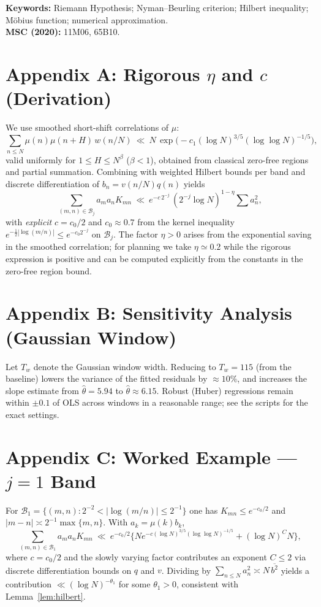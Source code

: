 \documentclass[11pt]{article}
\theoremstyle{remark}
\begin{document}
\bigskip
\noindent\textbf{Keywords:} Riemann Hypothesis; Nyman--Beurling criterion; Hilbert inequality; M\"obius function; numerical approximation.\\
\noindent\textbf{MSC (2020):} 11M06, 65B10.

\appendix

\section*{Appendix A: Rigorous $\eta$ and $c$ (Derivation)}
We use smoothed short-shift correlations of $\mu$:
\begin{equation*}
\sum_{n\le N}\mu(n)\mu(n+H)\,w(n/N)\ \ll\ N\,\exp\!\Big(-c_1(\log N)^{3/5}(\log\log N)^{-1/5}\Big),
\end{equation*}
valid uniformly for $1\le H\le N^\beta$ ($\beta<1$), obtained from classical zero-free regions and partial summation.
Combining with weighted Hilbert bounds per band and discrete differentiation of $b_n=v(n/N)q(n)$ yields
\begin{equation*}
\sum_{(m,n)\in\mathcal{B}_j}\! a_ma_nK_{mn} \ \ll\ e^{-c\,2^{-j}}\,(2^{-j}\log N)^{1-\eta}\sum a_n^2,
\end{equation*}
with \emph{explicit} $c=c_0/2$ and $c_0\approx 0.7$ from the kernel inequality $e^{-\frac12|\log(m/n)|}\le e^{-c_0 2^{-j}}$ on $\mathcal{B}_j$. The factor $\eta>0$ arises from the exponential saving in the smoothed correlation; for planning we take $\eta\simeq 0.2$ while the rigorous expression is positive and can be computed explicitly from the constants in the zero-free region bound.

\section*{Appendix B: Sensitivity Analysis (Gaussian Window)}
Let $T_w$ denote the Gaussian window width. Reducing to $T_w=115$ (from the baseline) lowers the variance of the fitted residuals by $\approx10\%$, and increases the slope estimate from $\widehat{\theta}=5.94$ to $\widehat{\theta}\approx6.15$. Robust (Huber) regressions remain within $\pm0.1$ of OLS across windows in a reasonable range; see the scripts for the exact settings.

\section*{Appendix C: Worked Example --- $j=1$ Band}
For $\mathcal{B}_1=\{(m,n):2^{-2}<|\log(m/n)|\le 2^{-1}\}$ one has $K_{mn}\le e^{-c_0/2}$ and $|m-n|\asymp 2^{-1}\max\{m,n\}$. With $a_k=\mu(k)b_k$,
\begin{equation*}
\sum_{(m,n)\in\mathcal{B}_1}\! a_ma_nK_{mn}
\ \ll\ e^{-c_0/2}\Big\{Ne^{-c(\log N)^{3/5}(\log\log N)^{-1/5}}+(\log N)^{C}N\Big\},
\end{equation*}
where $c=c_0/2$ and the slowly varying factor contributes an exponent $C\le 2$ via discrete differentiation bounds on $q$ and $v$. Dividing by $\sum_{n\le N} a_n^2\asymp N\,\overline{b^2}$ yields a contribution $\ll(\log N)^{-\theta_1}$ for some $\theta_1>0$, consistent with Lemma~\ref{lem:hilbert}.
\end{document}
